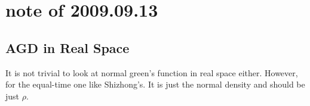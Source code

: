 \section{note of 2009.09.13}

\subsection{AGD in Real Space}
It is not trivial to look at normal green's function in real space either.  However, for the equal-time one like Shizhong's. It is just the normal density and should be just $\rho$.  
